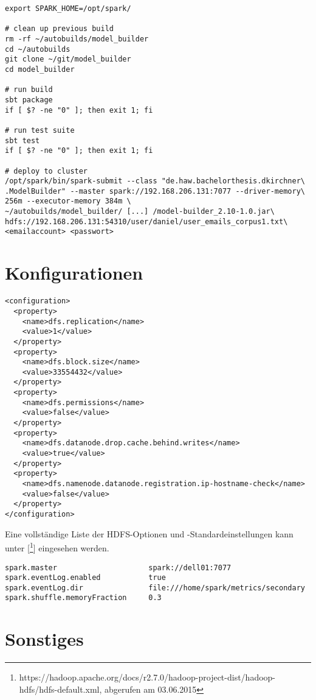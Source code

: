 \begin{appendices}
\begin{lstlisting}[caption={Einfache Continuous Deployment Pipeline. Beispiel: ModelBuilder},label={lst:cdp_modelbuilder}]
export SPARK_HOME=/opt/spark/

# clean up previous build
rm -rf ~/autobuilds/model_builder
cd ~/autobuilds
git clone ~/git/model_builder
cd model_builder

# run build
sbt package
if [ $? -ne "0" ]; then exit 1; fi

# run test suite
sbt test
if [ $? -ne "0" ]; then exit 1; fi

# deploy to cluster
/opt/spark/bin/spark-submit --class "de.haw.bachelorthesis.dkirchner\
.ModelBuilder" --master spark://192.168.206.131:7077 --driver-memory\
256m --executor-memory 384m \
~/autobuilds/model_builder/ [...] /model-builder_2.10-1.0.jar\
hdfs://192.168.206.131:54310/user/daniel/user_emails_corpus1.txt\
<emailaccount> <passwort>
\end{lstlisting}

\section{Konfigurationen}

\begin{lstlisting}[caption={hdfs-site.xml (Auszug): Beispiel mit Replikationsfaktor 1 und Blockgröße 32MB},label={lst:hdfs_config}]
<configuration>
  <property>
    <name>dfs.replication</name>
    <value>1</value>
  </property>
  <property>
    <name>dfs.block.size</name>
    <value>33554432</value>
  </property>
  <property>
    <name>dfs.permissions</name>
    <value>false</value>
  </property>
  <property>
    <name>dfs.datanode.drop.cache.behind.writes</name>
    <value>true</value>
  </property>
  <property>
    <name>dfs.namenode.datanode.registration.ip-hostname-check</name>
    <value>false</value>
  </property>
</configuration>
\end{lstlisting}

Eine vollständige Liste der HDFS-Optionen und -Standardeinstellungen kann unter [\footnote{https://hadoop.apache.org/docs/r2.7.0/hadoop-project-dist/hadoop-hdfs/hdfs-default.xml, abgerufen am 03.06.2015}] eingesehen werden.

\begin{lstlisting}[caption={spark-defaults.conf (Auszug)},label={lst:hdfs_config}]
spark.master                     spark://dell01:7077
spark.eventLog.enabled           true
spark.eventLog.dir               file:///home/spark/metrics/secondary
spark.shuffle.memoryFraction     0.3
\end{lstlisting}

\section{Sonstiges}

\end{appendices}
